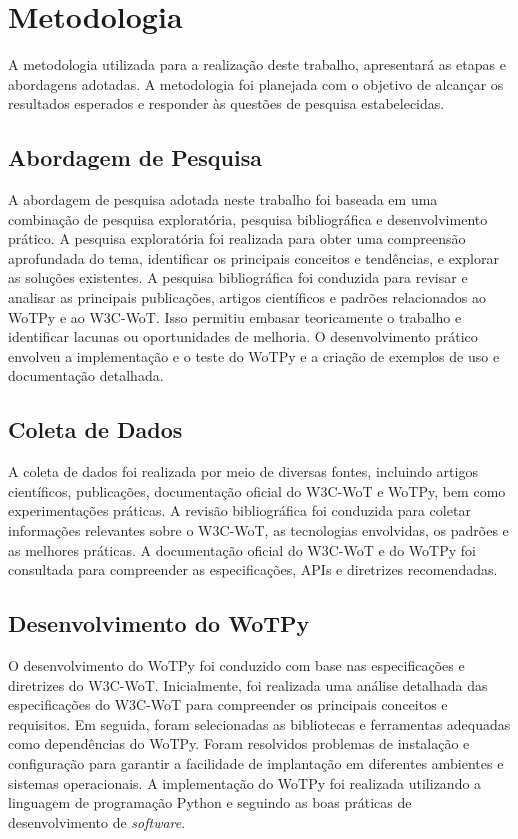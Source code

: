 \chapter{Metodologia}

A metodologia utilizada para a realização deste trabalho, apresentará as etapas e abordagens adotadas. A metodologia foi planejada com o objetivo de alcançar os resultados esperados e responder às questões de pesquisa estabelecidas.

\section{Abordagem de Pesquisa}

A abordagem de pesquisa adotada neste trabalho foi baseada em uma combinação de pesquisa exploratória, pesquisa bibliográfica e desenvolvimento prático. A pesquisa exploratória foi realizada para obter uma compreensão aprofundada do tema, identificar os principais conceitos e tendências, e explorar as soluções existentes. A pesquisa bibliográfica foi conduzida para revisar e analisar as principais publicações, artigos científicos e padrões relacionados ao WoTPy e ao W3C-WoT. Isso permitiu embasar teoricamente o trabalho e identificar lacunas ou oportunidades de melhoria. O desenvolvimento prático envolveu a implementação e o teste do WoTPy e a criação de exemplos de uso e documentação detalhada.

\section{Coleta de Dados}

A coleta de dados foi realizada por meio de diversas fontes, incluindo artigos científicos, publicações, documentação oficial do W3C-WoT e WoTPy, bem como experimentações práticas. A revisão bibliográfica foi conduzida para coletar informações relevantes sobre o W3C-WoT, as tecnologias envolvidas, os padrões e as melhores práticas. A documentação oficial do W3C-WoT  e do WoTPy  foi consultada para compreender as especificações, APIs e diretrizes recomendadas. 

\section{Desenvolvimento do WoTPy}

O desenvolvimento do WoTPy foi conduzido com base nas especificações e diretrizes do W3C-WoT. Inicialmente, foi realizada uma análise detalhada das especificações do W3C-WoT para compreender os principais conceitos e requisitos. Em seguida, foram selecionadas as bibliotecas e ferramentas adequadas como dependências do WoTPy. Foram resolvidos problemas de instalação e configuração para garantir a facilidade de implantação em diferentes ambientes e sistemas operacionais. A implementação do WoTPy foi realizada utilizando a linguagem de programação Python e seguindo as boas práticas de desenvolvimento de \textit{software}.

